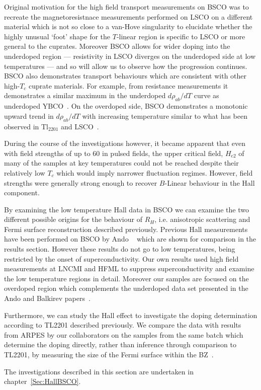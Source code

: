 Original motivation for the high field transport measurements on \ac{BSCO} was to recreate the magnetoresistnace measurements performed on \ac{LSCO} on a different material which is not so close to a van-Hove singularity to elucidate whether the highly unusual `foot' shape for the $T$-linear region is specific to \ac{LSCO} or more general to the cuprates. Moreover \ac{BSCO} allows for wider doping into the underdoped region --- resistivity in \ac{LSCO} diverges on the underdoped side at low temperatures --- and so will allow us to observe how the progression continues.  \ac{BSCO} also demonstrates transport behaviours which are consistent with other high-$T_c$ cuprate materials. For example, from resistance measurements it demonstrates a similar maximum in the underdoped $d\rho_{ab}/dT$ curve as underdoped YBCO~\cite{Ando1999}. On the overdoped side, \ac{BSCO} demonstrates a monotonic upward trend in $d\rho_{ab}/dT$ with increasing temperature similar to what has been observed in Tl$_{2201}$ and \ac{LSCO}~\cite{Ando1999}.

During the course of the investigations however, it became apparent that even with field strengths of up to \unit{60}{\tesla} in pulsed fields, the upper critical field, $H_{\textrm{c2}}$ of many of the samples at key temperatures could not be reached despite their relatively low $T_c$ which would imply narrower fluctuation regimes. However, field strengths were generally strong enough to recover $B$-Linear behaviour in the Hall component.

By examining the low temperature Hall data in \ac{BSCO} we can examine the two different possible origins for the behaviour of $R_H$, i.e. anisotropic scattering and Fermi surface reconstruction described previously. Previous Hall measurements have been performed on \ac{BSCO} by Ando \etal~\cite{Ando1999, Ando2000} which are shown for comparison in the results section. However these results do not go to low temperatures, being restricted by the onset of superconductivity. Our own results used high field measurements at \ac{LNCMI} and \ac{HFML} to suppress superconductivity and examine the low temperature regions in detail. Moreover our samples are focused on the overdoped region which complements the underdoped data set presented in the Ando and Balkirev papers~\cite{Balakirev2003}.

Furthermore, we can study the Hall effect to investigate the doping determination according to \ac{TL2201} described previously. We compare the data with results from \ac{ARPES} by our collaborators on the samples from the same batch which determine the doping directly, rather than inference through comparison to \ac{TL2201}, by measuring the size of the Fermi surface within the \ac{BZ}~\cite{Kondo2004}.

The investigations described in this section are undertaken in chapter~\ref{Sec:HallBSCO}.


